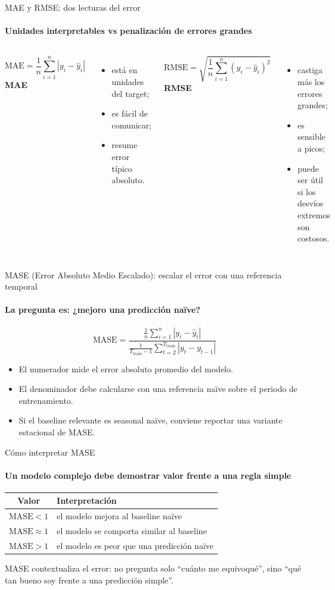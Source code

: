 \documentclass[aspectratio=169,11pt]{beamer}  %
\newcommand{\hrow}{\rowcolor{mlcream}}
\begin{document}
\begin{frame}{MAE y RMSE: dos lecturas del error}
\framesubtitle{Unidades interpretables vs penalización de errores grandes}
\begin{columns}[T]
{\Large\[ \mathrm{MAE} = \frac{1}{n}\sum_{i=1}^{n} |y_i - \hat y_i| \]}
\textbf{MAE}
\begin{itemize}
\item está en unidades del target;
\item es fácil de comunicar;
\item resume error típico absoluto.
\end{itemize}
{\Large\[ \mathrm{RMSE} = \sqrt{\frac{1}{n}\sum_{i=1}^{n} (y_i - \hat y_i)^2} \]}
\textbf{RMSE}
\begin{itemize}
\item castiga más los errores grandes;
\item es sensible a picos;
\item puede ser útil si los desvíos extremos son costosos.
\end{itemize}
\end{columns}
\end{frame}


\begin{frame}{MASE (Error Absoluto Medio Escalado): escalar el error con una referencia temporal}
\framesubtitle{La pregunta es: ¿mejoro una predicción naïve?}
{\Large\[ \mathrm{MASE} = \frac{\frac{1}{n}\sum_{i=1}^{n} |y_i - \hat y_i|}{\frac{1}{T_{\mathrm{train}}-1}\sum_{t=2}^{T_{\mathrm{train}}} |y_t - y_{t-1}|} \]}
\begin{itemize}
\item El numerador mide el error absoluto promedio del modelo.
\item El denominador debe calcularse con una referencia naïve sobre el periodo de entrenamiento.
\item Si el baseline relevante es seasonal naïve, conviene reportar una variante estacional de MASE.
\end{itemize}
\end{frame}

\begin{frame}{Cómo interpretar MASE}
\framesubtitle{Un modelo complejo debe demostrar valor frente a una regla simple}
\centering\large
\begin{tabular}{@{}c P{0.6\textwidth}@{}}
\toprule
\hrow \textbf{Valor} & Interpretación\\
\midrule
$\mathrm{MASE} < 1$ & el modelo mejora al baseline naïve\\
$\mathrm{MASE} \approx 1$ & el modelo se comporta similar al baseline\\
$\mathrm{MASE} > 1$ & el modelo es peor que una predicción naïve\\
\bottomrule
\end{tabular}

\vspace{1em}
MASE contextualiza el error: no pregunta solo ``cuánto me equivoqué'', sino ``qué tan bueno soy frente a una predicción simple''.
\end{frame}
\end{document}
